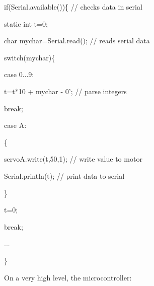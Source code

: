 \documentclass[
  letterpaper,
  DIV=11,
  numbers=noendperiod]{scrreprt}
\newenvironment{Shaded}{\begin{snugshade}}{\end{snugshade}}
\newcommand{\AttributeTok}[1]{\textcolor[rgb]{0.40,0.45,0.13}{#1}}
\newcommand{\CharTok}[1]{\textcolor[rgb]{0.13,0.47,0.30}{#1}}
\newcommand{\CommentTok}[1]{\textcolor[rgb]{0.37,0.37,0.37}{#1}}
\newcommand{\ControlFlowTok}[1]{\textcolor[rgb]{0.00,0.23,0.31}{#1}}
\newcommand{\DataTypeTok}[1]{\textcolor[rgb]{0.68,0.00,0.00}{#1}}
\newcommand{\DecValTok}[1]{\textcolor[rgb]{0.68,0.00,0.00}{#1}}
\newcommand{\ErrorTok}[1]{\textcolor[rgb]{0.68,0.00,0.00}{#1}}
\newcommand{\NormalTok}[1]{\textcolor[rgb]{0.00,0.23,0.31}{#1}}
\newcommand{\OperatorTok}[1]{\textcolor[rgb]{0.37,0.37,0.37}{#1}}
\begin{document}
\begin{Shaded}
\begin{Highlighting}[]

\ControlFlowTok{if}\OperatorTok{(}\NormalTok{Serial}\OperatorTok{.}\NormalTok{available}\OperatorTok{())\{} \CommentTok{// checks data in serial}

  \AttributeTok{static} \DataTypeTok{int}\NormalTok{ t}\OperatorTok{=}\DecValTok{0}\OperatorTok{;}

    \DataTypeTok{char}\NormalTok{ mychar}\OperatorTok{=}\NormalTok{Serial}\OperatorTok{.}\NormalTok{read}\OperatorTok{();} \CommentTok{// reads serial data}

    \ControlFlowTok{switch}\OperatorTok{(}\NormalTok{mychar}\OperatorTok{)\{}      

      \ControlFlowTok{case} \CharTok{\textquotesingle{}0\textquotesingle{}}\OperatorTok{...}\CharTok{\textquotesingle{}9\textquotesingle{}}\OperatorTok{:}

\NormalTok{        t}\OperatorTok{=}\NormalTok{t}\OperatorTok{*}\DecValTok{10} \OperatorTok{+}\NormalTok{ mychar }\OperatorTok{{-}} \CharTok{\textquotesingle{}0}\ErrorTok{’; // parse integers​}

        \ControlFlowTok{break}\OperatorTok{;}

      \ControlFlowTok{case} \CharTok{\textquotesingle{}A\textquotesingle{}}\OperatorTok{:}

        \OperatorTok{\{}

\NormalTok{            servoA}\OperatorTok{.}\NormalTok{write}\OperatorTok{(}\NormalTok{t}\OperatorTok{,}\DecValTok{50}\OperatorTok{,}\DecValTok{1}\OperatorTok{);} \CommentTok{// write value to motor}

\NormalTok{            Serial}\OperatorTok{.}\NormalTok{println}\OperatorTok{(}\NormalTok{t}\OperatorTok{);} \CommentTok{// print data to serial}

        \OperatorTok{\}}

\NormalTok{        t}\OperatorTok{=}\DecValTok{0}\OperatorTok{;}\NormalTok{​}

        \ControlFlowTok{break}\OperatorTok{;}\NormalTok{​}

        \OperatorTok{...}\NormalTok{​}

    \OperatorTok{\}}
\end{Highlighting}
\end{Shaded}

On a very high level, the microcontroller:
\end{document}

